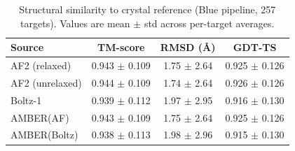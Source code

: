 \begin{table}[htbp]
\centering
\caption{Structural similarity to crystal reference (Blue pipeline, 257 targets). Values are mean $\pm$ std across per-target averages.}
\label{tab:pre-rosetta}
\begin{tabular}{lccc}
\toprule
Source & TM-score & RMSD (\AA) & GDT-TS \\
\midrule
  AF2 (relaxed) & 0.943 $\pm$ 0.109 & 1.75 $\pm$ 2.64 & 0.925 $\pm$ 0.126 \\
  AF2 (unrelaxed) & 0.944 $\pm$ 0.109 & 1.74 $\pm$ 2.64 & 0.926 $\pm$ 0.126 \\
  Boltz-1 & 0.939 $\pm$ 0.112 & 1.97 $\pm$ 2.95 & 0.916 $\pm$ 0.130 \\
  AMBER(AF) & 0.943 $\pm$ 0.109 & 1.75 $\pm$ 2.64 & 0.925 $\pm$ 0.126 \\
  AMBER(Boltz) & 0.938 $\pm$ 0.113 & 1.98 $\pm$ 2.96 & 0.915 $\pm$ 0.130 \\
\bottomrule
\end{tabular}
\end{table}